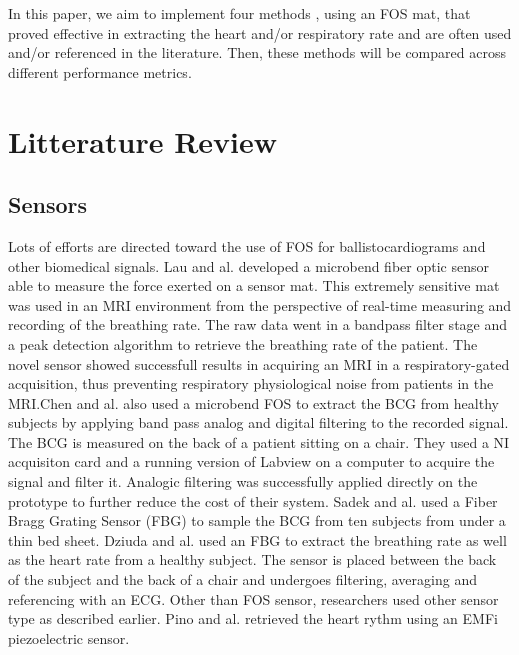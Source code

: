 \documentclass[twoside,twocolumn]{article}
\begin{document}
	In this paper, we aim to implement four methods \cite{sadek_automatic_2015}\cite{sadek_continuous_2017}\cite{bruser_adaptive_2011}\cite{zhu_heart_2014}, using an FOS mat, that proved effective in extracting the heart and/or respiratory rate and are often used and/or referenced in the literature. Then, these methods will be compared across different performance metrics.

\section{Litterature Review}
\label{section:LR}
	\subsection{Sensors}
	\label{subsection:LR-Sensors}
		Lots of efforts are directed toward the use of FOS for ballistocardiograms and other biomedical signals. Lau and al. \cite{lau_intensity-modulated_2013} developed a microbend fiber optic sensor able to measure the force exerted on a sensor mat. This extremely sensitive mat was used in an MRI environment from the perspective of real-time measuring and recording of the breathing rate. The raw data went in a bandpass filter stage and a peak detection algorithm to retrieve the breathing rate of the patient. The novel sensor showed successfull results in acquiring an MRI in a respiratory-gated acquisition, thus preventing respiratory physiological noise from patients in the MRI.Chen and al. \cite{chen_portable_2012} also used a microbend FOS to extract the BCG from healthy subjects by applying band pass analog and digital filtering to the recorded signal. The BCG is measured on the back of a patient sitting on a chair. They used a NI acquisiton card and a running version of Labview on a computer to acquire the signal and filter it. Analogic filtering was successfully applied directly on the prototype to further reduce the cost of their system. Sadek and al. \cite{sadek_automatic_2015} used a Fiber Bragg Grating Sensor (FBG) to sample the BCG from ten subjects from under a thin bed sheet.  Dziuda and al. \cite{dziuda_monitoring_2012} used  an FBG to extract the breathing rate as well as the heart rate from a healthy subject. The sensor is placed between the back of the subject and the back of a chair and undergoes filtering, averaging and referencing with an ECG. Other than FOS sensor, researchers used other sensor type as described earlier. Pino and al. \cite{pino_noninvasive_2015} retrieved the heart rythm using an EMFi piezoelectric sensor.
	
\end{document}
